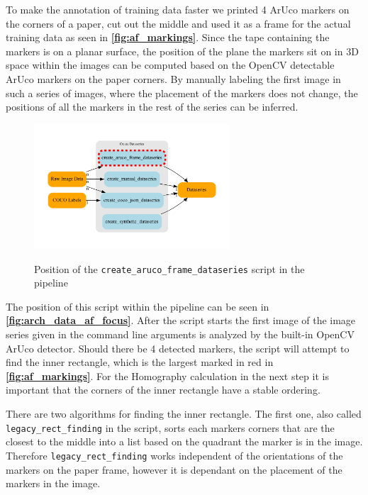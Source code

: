 \documentclass[10pt]{book}
\newcommand{\figureref}[1]{\textbf{\autoref{#1}}}
\begin{document}
To make the annotation of training data faster we printed 4 \ac{ArUco} markers on the corners of a paper, cut out the middle and used it as a frame for the actual training data as seen in \figureref{fig:af_markings}. Since the tape containing the markers is on a planar surface, the position of the plane the markers sit on in 3D space within the images can be computed based on the \ac{OpenCV} detectable \ac{ArUco} markers on the paper corners. By manually labeling the first image in such a series of images, where the placement of the markers does not change, the positions of all the markers in the rest of the series can be inferred.

\begin{figure}
  \caption{Position of the \texttt{create\_aruco\_frame\_dataseries} script in the pipeline}
  \includegraphics[width=0.65\textwidth]{graph/arch_data_af_focus}
  \label{fig:arch_data_af_focus}
\end{figure}

The position of this script within the pipeline can be seen in \figureref{fig:arch_data_af_focus}. After the script starts the first image of the image series given in the command line arguments is analyzed by the built-in \ac{OpenCV} \ac{ArUco} detector. Should there be 4 detected markers, the script will attempt to find the inner rectangle, which is the largest marked in red in \figureref{fig:af_markings}. For the Homography calculation in the next step it is important that the corners of the inner rectangle have a stable ordering. 

There are two algorithms for finding the inner rectangle. The first one, also called \texttt{legacy\_rect\_finding} in the script, sorts each markers corners that are the closest to the middle into a list based on the quadrant the marker is in the image. Therefore \texttt{legacy\_rect\_finding} works independent of the orientations of the markers on the paper frame, however it is dependant on the placement of the markers in the image. 
\end{document}
